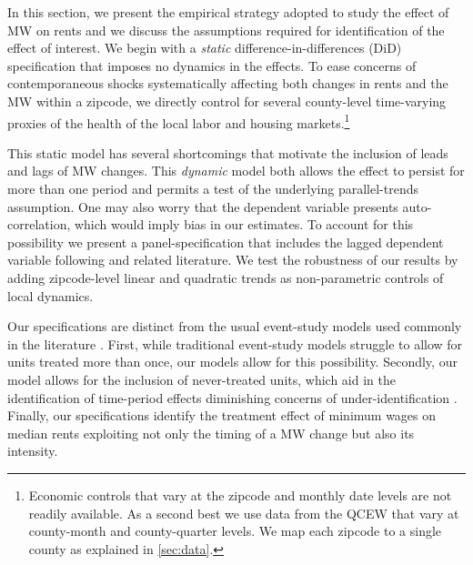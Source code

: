 
In this section, we present the empirical strategy adopted to study the effect of MW 
on rents and we discuss the assumptions required for identification of the effect of 
interest. We begin with a \textit{static} difference-in-differences (DiD) specification 
that imposes no dynamics in the effects. To ease concerns of contemporaneous shocks 
systematically affecting both changes in rents and the MW within a zipcode, we 
directly control for several county-level time-varying proxies of the health of the 
local labor and housing markets.\footnote{Economic controls that vary at the zipcode 
	and	monthly date levels are not readily available. As a second best we use data 
	from the QCEW that vary at county-month and county-quarter levels. We map each 
	zipcode to a single county as explained in \autoref{sec:data}.} 

This static model has several shortcomings that motivate the inclusion of leads and 
lags of MW changes. This \textit{dynamic} model both allows the effect to persist for 
more than one period and permits a test of the underlying parallel-trends assumption. 
One may also worry that the dependent variable presents auto-correlation, which would 
imply bias in our estimates. To account for this possibility we present a 
panel-specification that includes the lagged dependent variable following 
\textcite{ArellanoBond1991} and related literature. We test the robustness of our 
results by adding zipcode-level linear and quadratic trends as non-parametric 
controls of local dynamics. 

Our specifications are distinct from the usual event-study models used 
commonly in the literature \parencite[discussed in, e.g.,][]{BorusyakJaravel2017, 
abraham2018}. First, while traditional event-study models struggle to allow for 
units treated more than once, our models allow for this possibility. Secondly, 
our model allows for the inclusion of never-treated units, which aid in the 
identification of time-period effects diminishing concerns of under-identification 
\parencite{BorusyakJaravel2017}. Finally, our specifications identify the treatment 
effect of minimum wages on median rents exploiting not only the timing of a MW change 
but also its intensity.
    
